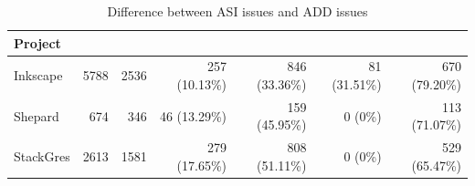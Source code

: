 \begin{table}
    \centering
    \caption{Difference between ASI issues and ADD issues}
    \scriptsize
    \label{tab:overlap}
    \setlength{\tabcolsep}{2pt}    %
    \renewcommand{\arraystretch}{1.1} %
    \begin{tabular}{lrrrrrr}
        \toprule
        Project &
         &
         &
         &
         &
         &
         \\
        \midrule
        Inkscape  & 5788 & 2536 & 257 (10.13\%) & 846 (33.36\%) & 81 (31.51\%) & 670 (79.20\%)  \\
        Shepard   &  674 &  346 & 46 (13.29\%) & 159 (45.95\%) & 0\hphantom{00.0} (0\%)  &  113 (71.07\%) \\
        StackGres & 2613 & 1581 & 279 (17.65\%) & 808 (51.11\%) &  0\hphantom{00.0} (0\%)  & 529 (65.47\%) \\
        \bottomrule
    \end{tabular}
\end{table}